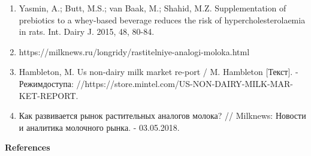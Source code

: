 \begin{enumerate}
\item
Yasmin, A.; Butt, M.S.; van Baak, M.; Shahid, M.Z. Supplementation of
prebiotics to a whey-based beverage reduces the risk of
hypercholesterolaemia in rats. Int. Dairy J. 2015, 48, 80-84.

\item
https://milknews.ru/longridy/rastitelniye-analogi-moloka.html

\item
Hambleton, M. Us non-dairy milk market re-port / M. Hambleton
{[}Текст{]}. - Режимдоступа:
//https://store.mintel.com/US-NON-DAIRY-MILK-MAR-KET-REPORT.

\item
Как развивается рынок растительных аналогов молока? // Milknews:
Новости и аналитика молочного рынка. - 03.05.2018.
\end{enumerate}

\begin{center}
{\bfseries References}
\end{center}

